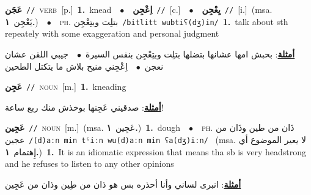 \documentclass[10pt,a4paper,twoside]{article} %
\begin{document}
\begin{multicols}{2}
{\setlength\topsep{0pt}\textbf{\foreignlanguage{arabic}{عَجَن}}\ {\color{gray}\texttt{//}\color{black}}\ \textsc{verb}\ [p.]\ \textbf{1.}~knead\ \ $\bullet$\ \ \setlength\topsep{0pt}\textbf{\foreignlanguage{arabic}{اِعْجِن}}\ {\color{gray}\texttt{//}\color{black}}\ [c.]\ \ $\bullet$\ \ \setlength\topsep{0pt}\textbf{\foreignlanguage{arabic}{يِعْجِن}}\ {\color{gray}\texttt{//}\color{black}}\ [i.]\ \color{gray}(msa. \foreignlanguage{arabic}{يَعْجِن}~\foreignlanguage{arabic}{\textbf{١.}})\color{black}\ \ $\bullet$\ \ \textsc{ph.} \color{gray} \foreignlanguage{arabic}{بتلِت وبتِعْجِن}\color{black}\ {\color{gray}\texttt{/{\sffamily bitlitt wubtiʕ(dʒ)in}/}\color{black}}\ \textbf{1.}~talk about sth repeately with some exaggeration and personal judgment\  \begin{flushright}\color{gray}\foreignlanguage{arabic}{\textbf{\underline{\foreignlanguage{arabic}{أمثلة}}}: بحبش امها عشانها بتضلها بتلِت وبتِعْجِن بنفس السيرة\ $\bullet$\ \  جيبي اللقن عشان نعجن\ $\bullet$\ \  اِعْجِني منيح بلاش ما يتكتل الطحين}\end{flushright}\color{black}} \vspace{2mm}

{\setlength\topsep{0pt}\textbf{\foreignlanguage{arabic}{عَجِن}}\ {\color{gray}\texttt{//}\color{black}}\ \textsc{noun}\ [m.]\ \textbf{1.}~kneading\  \begin{flushright}\color{gray}\foreignlanguage{arabic}{\textbf{\underline{\foreignlanguage{arabic}{أمثلة}}}: صدقيني عَجِنها بوخذش منك ربع ساعة!}\end{flushright}\color{black}} \vspace{2mm}

{\setlength\topsep{0pt}\textbf{\foreignlanguage{arabic}{عَجِين}}\ {\color{gray}\texttt{//}\color{black}}\ \textsc{noun}\ [m.]\ \color{gray}(msa. \foreignlanguage{arabic}{عَجِين}~\foreignlanguage{arabic}{\textbf{١.}})\color{black}\ \textbf{1.}~dough\ \ $\bullet$\ \ \textsc{ph.} \color{gray} \foreignlanguage{arabic}{ذَان من طين وذَان من عجين}\color{black}\ {\color{gray}\texttt{/{\sffamily (d)aːn min tˤiːn wu(d)aːn min ʕa(dʒ)iːn}/}\color{black}}\ \color{gray} (msa. \foreignlanguage{arabic}{لا يعير الموضوع أي إِهتمام}~\foreignlanguage{arabic}{\textbf{١.}})\color{black}\ \textbf{1.}~It is an idiomatic expression that means tha sb is very headstrong and he refuses to listen to any other opinions\  \begin{flushright}\color{gray}\foreignlanguage{arabic}{\textbf{\underline{\foreignlanguage{arabic}{أمثلة}}}: انبرى لساني وأنا أحذره بس هو ذان من طِين وذان من عَجِِين}\end{flushright}\color{black}} \vspace{2mm}


\end{multicols}
\end{document}

